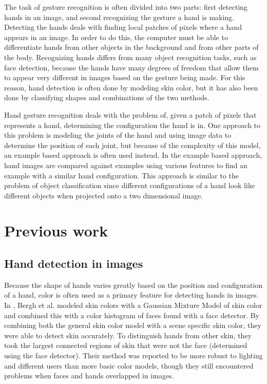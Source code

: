 \documentclass[10pt,twocolumn,letterpaper]{article}
\begin{document}
The task of gesture recognition is often divided into two parts: first detecting hands in an image, and second recognizing the gesture a hand is making. Detecting the hands deals with finding local patches of pixels where a hand appears in an image. In order to do this, the computer must be able to differentiate hands from other objects in the background and from other parts of the body. Recognizing hands differs from many object recognition tasks, such as face detection, because the hands have many degrees of freedom that allow them to appear very different in images based on the gesture being made. For this reason, hand detection is often done by modeling skin color, but it has also been done by classifying shapes and combinations of the two methods.

Hand gesture recognition deals with the problem of, given a patch of pixels that represents a hand, determining the configuration the hand is in. One approach to this problem is modeling the joints of the hand and using image data to determine the position of each joint, but because of the complexity of this model, an example based approach is often used instead. In the example based approach, hand images are compared against examples using various features to find an example with a similar hand configuration. This approach is similar to the problem of object classification since different configurations of a hand look like different objects when projected onto a two dimensional image.

\section{Previous work}

\subsection{Hand detection in images}

Because the shape of hands varies greatly based on the position and configuration of a hand, color is often used as a primary feature for detecting hands in images. In \cite{van2009haarlet}, Bergh et al. modeled skin colors with a Gaussian Mixture Model of skin color and combined this with a color histogram of faces found with a face detector. By combining both the general skin color model with a scene specific skin color, they were able to detect skin accurately. To distinguish hands from other skin, they took the largest connected regions of skin that were not the face (determined using the face detector). Their method was reported to be more robust to lighting and different users than more basic color models, though they still encountered problems when faces and hands overlapped in images.
\end{document}
